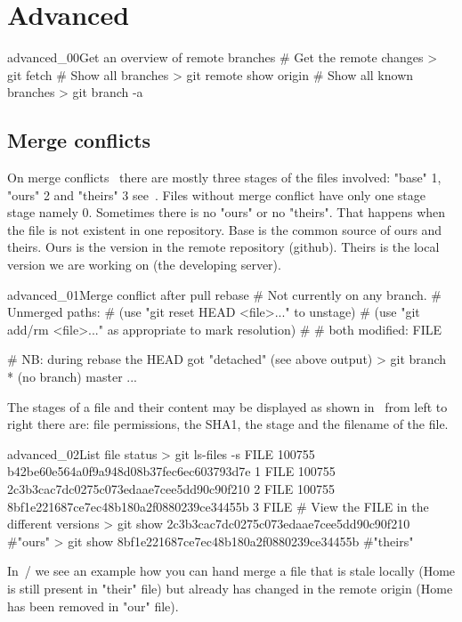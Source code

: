 \section{Advanced}
\begin{codelisting}{advanced_00}{Get an overview of remote branches}
# Get the remote changes
> git fetch
# Show all branches
> git remote show origin
# Show all known branches
> git branch -a
\end{codelisting}
\subsection{Merge conflicts}
On merge conflicts~ there are mostly three stages of the files involved: "base" 1, "ours" 2 and "theirs" 3 see~. Files without merge conflict have only one stage stage namely 0. Sometimes there is no "ours" or no "theirs". That happens when the file is not existent in one repository. Base is the common source of ours and theirs. Ours is the version in the remote repository (github). Theirs is the local version we are working on (the developing server).
\begin{codelisting}{advanced_01}{Merge conflict after pull rebase}
# Not currently on any branch.
# Unmerged paths:
#   (use "git reset HEAD <file>..." to unstage)
#   (use "git add/rm <file>..." as appropriate to mark resolution)
#
#       both modified:    FILE

# NB: during rebase the HEAD got "detached" (see above output)
> git branch
* (no branch)
  master
...
\end{codelisting}
The stages of a file and their content may be displayed as shown in~ from left to right there are: file permissions, the SHA1, the stage and the filename of the file.
\begin{codelisting}{advanced_02}{List file status}
> git ls-files -s FILE
100755 b42be60e564a0f9a948d08b37fec6ec603793d7e 1       FILE
100755 2c3b3cac7dc0275c073edaae7cee5dd90c90f210 2       FILE
100755 8bf1e221687ce7ec48b180a2f0880239ce34455b 3       FILE
# View the FILE in the different versions
> git show 2c3b3cac7dc0275c073edaae7cee5dd90c90f210 #"ours"
> git show 8bf1e221687ce7ec48b180a2f0880239ce34455b #"theirs"
\end{codelisting}
In~/ we see an example how you can hand merge a file that is stale locally (Home is still present in "their" file) but already has changed in the remote origin (Home has been removed in "our" file).
